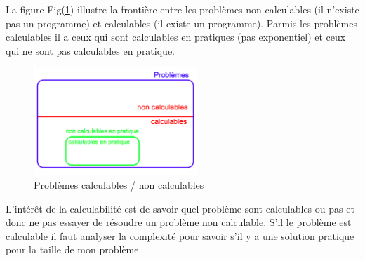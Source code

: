 La figure Fig(\ref{cal_non_cal}) illustre la frontière entre les problèmes non calculables (il n'existe pas un programme) et calculables (il existe un programme).  Parmis les problèmes calculables il a ceux qui sont calculables en pratiques (pas exponentiel) et ceux qui ne sont pas calculables en pratique. 

\begin{figure}[h]
  \centering
  \includegraphics[width=0.55\textwidth]{Images/Problemes_calculables_et_non_calculables.png}
  \caption{ Problèmes calculables / non calculables }
  \label{cal_non_cal}
\end{figure}

L'intérêt de la calculabilité est de savoir quel problème sont calculables ou pas et donc ne pas essayer de résoudre un problème non calculable. S'il le problème est calculable il faut analyser la complexité pour savoir s'il y a une solution pratique pour la taille de mon problème. 

